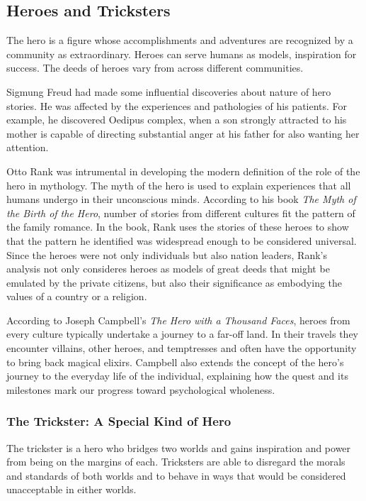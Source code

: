 \documentclass{article}
\begin{document}
\subsection{Heroes and Tricksters}

The hero is a figure whose accomplishments and adventures are recognized by a community as extraordinary. Heroes can serve humans as models, inspiration for success. The deeds of heroes vary from across different communities.

Sigmung Freud had made some influential discoveries about nature of hero stories. He was affected by the experiences and pathologies of his patients. For example, he discovered Oedipus complex, when a son strongly attracted to his mother is capable of directing substantial anger at his father for also wanting her attention.

Otto Rank was intrumental in developing the modern definition of the role of the hero in mythology. The myth of the hero is used to explain experiences that all humans undergo in their unconscious minds. According to his book \textit{The Myth of the Birth of the Hero}, number of stories from different cultures fit the pattern of the family romance. In the book, Rank uses the stories of these heroes to show that the pattern he identified was widespread enough to be considered universal. Since the heroes were not only individuals but also nation leaders, Rank's analysis not only consideres heroes as models of great deeds that might be emulated by the private citizens, but also their significance as embodying the values of a country or a religion.

According to Joseph Campbell's \textit{The Hero with a Thousand Faces}, heroes from every culture typically undertake a journey to a far-off land. In their travels they encounter villains, other heroes, and temptresses and often have the opportunity to bring back magical elixirs. Campbell also extends the concept of the hero's journey to the everyday life of the individual, explaining how the quest and its milestones mark our progress toward psychological wholeness.

\subsubsection{The Trickster: A Special Kind of Hero}

The trickster is a hero who bridges two worlds and gains inspiration and power from being on the margins of each. Tricksters are able to disregard the morals and standards of both worlds and to behave in ways that would be considered unacceptable in either worlds.
\end{document}
